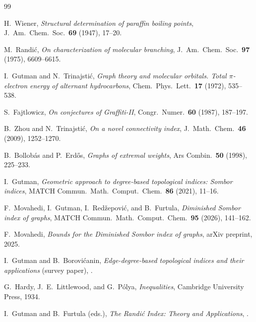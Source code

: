\documentclass[11pt,a4paper]{article}
\theoremstyle{definition}
\newcommand{\todo}[1]{}
\begin{document}
\begin{thebibliography}{99}
\small

H.~Wiener,
\emph{Structural determination of paraffin boiling points},
J.~Am.~Chem.~Soc.~\textbf{69} (1947), 17--20.

M.~Randi\'c,
\emph{On characterization of molecular branching},
J.~Am.~Chem.~Soc.~\textbf{97} (1975), 6609--6615.

I.~Gutman and N.~Trinajsti\'c,
\emph{Graph theory and molecular orbitals. Total
$\pi$-electron energy of alternant hydrocarbons},
Chem.~Phys.~Lett.~\textbf{17} (1972), 535--538.

S.~Fajtlowicz,
\emph{On conjectures of Graffiti-II},
Congr.~Numer.~\textbf{60} (1987), 187--197.

B.~Zhou and N.~Trinajsti\'c,
\emph{On a novel connectivity index},
J.~Math.~Chem.~\textbf{46} (2009), 1252--1270.

B.~Bollob\'as and P.~Erd\H{o}s,
\emph{Graphs of extremal weights},
Ars Combin.~\textbf{50} (1998), 225--233.

I.~Gutman,
\emph{Geometric approach to degree-based topological indices: Sombor indices},
MATCH Commun.~Math.~Comput.~Chem.~\textbf{86} (2021), 11--16.

F.~Movahedi, I.~Gutman, I.~Red\v{z}epovi\'c, and B.~Furtula,
\emph{Diminished Sombor index of graphs},
MATCH Commun.~Math.~Comput.~Chem.~\textbf{95} (2026), 141--162.

F.~Movahedi,
\emph{Bounds for the Diminished Sombor index of graphs},
arXiv preprint, 2025. \todo{[VOL/ID REFERENCE NEEDED]}

I.~Gutman and B.~Borovi\'canin,
\emph{Edge-degree-based topological indices and their applications}
(survey paper), \todo{[FULL CITATION REFERENCE NEEDED]}.

G.~Hardy, J.~E.~Littlewood, and G.~P\'olya,
\emph{Inequalities},
Cambridge University Press, 1934.

I.~Gutman and B.~Furtula (eds.),
\emph{The Randi\'c Index: Theory and Applications},
\todo{[PUBLISHER / YEAR REFERENCE NEEDED]}.


\end{thebibliography}
\end{document}
